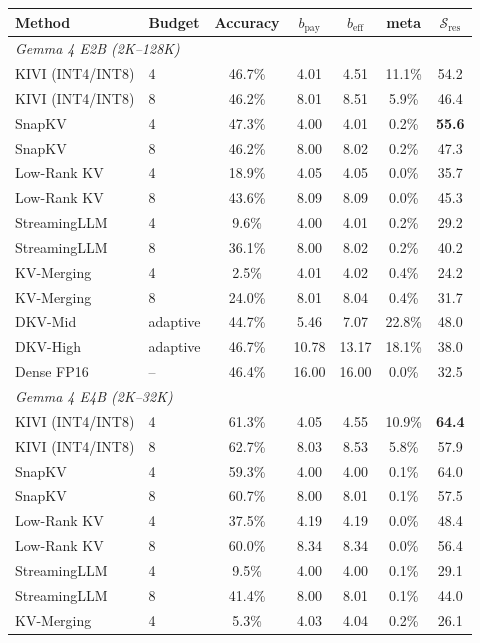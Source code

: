 \begin{tabular}{ll ccc c c}
\toprule
\textbf{Method} & \textbf{Budget} & \textbf{Accuracy} & $b_{\text{pay}}$ & $b_{\text{eff}}$ & \textbf{meta} & $\mathcal{S}_{\text{res}}$ \\
\midrule
\multicolumn{7}{l}{\textit{Gemma 4 E2B (2K--128K)}} \\
\midrule
KIVI (INT4/INT8) & 4 & 46.7\% & 4.01 & 4.51 & 11.1\% & 54.2 \\
KIVI (INT4/INT8) & 8 & 46.2\% & 8.01 & 8.51 & 5.9\% & 46.4 \\
SnapKV & 4 & 47.3\% & 4.00 & 4.01 & 0.2\% & \textbf{55.6} \\
SnapKV & 8 & 46.2\% & 8.00 & 8.02 & 0.2\% & 47.3 \\
Low-Rank KV & 4 & 18.9\% & 4.05 & 4.05 & 0.0\% & 35.7 \\
Low-Rank KV & 8 & 43.6\% & 8.09 & 8.09 & 0.0\% & 45.3 \\
StreamingLLM & 4 & 9.6\% & 4.00 & 4.01 & 0.2\% & 29.2 \\
StreamingLLM & 8 & 36.1\% & 8.00 & 8.02 & 0.2\% & 40.2 \\
KV-Merging & 4 & 2.5\% & 4.01 & 4.02 & 0.4\% & 24.2 \\
KV-Merging & 8 & 24.0\% & 8.01 & 8.04 & 0.4\% & 31.7 \\
DKV-Mid & adaptive & 44.7\% & 5.46 & 7.07 & 22.8\% & 48.0 \\
DKV-High & adaptive & 46.7\% & 10.78 & 13.17 & 18.1\% & 38.0 \\
Dense FP16 & -- & 46.4\% & 16.00 & 16.00 & 0.0\% & 32.5 \\
\midrule
\multicolumn{7}{l}{\textit{Gemma 4 E4B (2K--32K)}} \\
\midrule
KIVI (INT4/INT8) & 4 & 61.3\% & 4.05 & 4.55 & 10.9\% & \textbf{64.4} \\
KIVI (INT4/INT8) & 8 & 62.7\% & 8.03 & 8.53 & 5.8\% & 57.9 \\
SnapKV & 4 & 59.3\% & 4.00 & 4.00 & 0.1\% & 64.0 \\
SnapKV & 8 & 60.7\% & 8.00 & 8.01 & 0.1\% & 57.5 \\
Low-Rank KV & 4 & 37.5\% & 4.19 & 4.19 & 0.0\% & 48.4 \\
Low-Rank KV & 8 & 60.0\% & 8.34 & 8.34 & 0.0\% & 56.4 \\
StreamingLLM & 4 & 9.5\% & 4.00 & 4.00 & 0.1\% & 29.1 \\
StreamingLLM & 8 & 41.4\% & 8.00 & 8.01 & 0.1\% & 44.0 \\
KV-Merging & 4 & 5.3\% & 4.03 & 4.04 & 0.2\% & 26.1 \\

\end{tabular}
